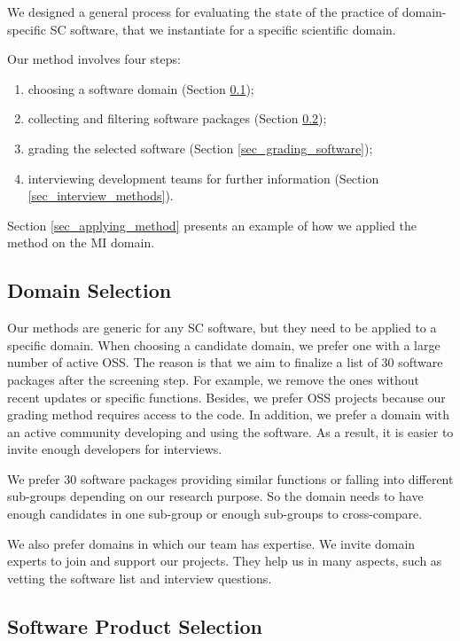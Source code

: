 \documentclass[preprint,12pt,authoryear]{elsarticle}
\begin{document}
We designed a general process for evaluating the state of the practice of
domain-specific SC software, that we instantiate for a specific scientific
domain.

Our method involves four steps:
\begin{enumerate}
\item choosing a software domain (Section \ref{sec_domain_selection});
\item collecting and filtering software packages (Section
\ref{sec_software_selection});
\item grading the selected software (Section \ref{sec_grading_software});
\item interviewing development teams for further information (Section
\ref{sec_interview_methods}).
\end{enumerate}

\noindent Section \ref{sec_applying_method} presents an example of how we
applied the method on the MI domain.

\subsection{Domain Selection} \label{sec_domain_selection}

Our methods are generic for any SC software, but they need to be applied to a
specific domain. When choosing a candidate domain, we prefer one with a large
number of active OSS. The reason is that we aim to finalize a list of 30
software packages \citep{SmithEtAl2021} after the screening step. For example, we
remove the ones without recent updates or specific functions. Besides, we prefer
OSS projects because our grading method requires access to the code. In
addition, we prefer a domain with an active community developing and using the
software. As a result, it is easier to invite enough developers for interviews.

We prefer 30 software packages providing similar functions or falling into
different sub-groups depending on our research purpose. So the domain needs to
have enough candidates in one sub-group or enough sub-groups to cross-compare.

We also prefer domains in which our team has expertise. We invite domain experts
to join and support our projects. They help us in many aspects, such as vetting
the software list and interview questions.

\subsection{Software Product Selection} \label{sec_software_selection}
\end{document}
